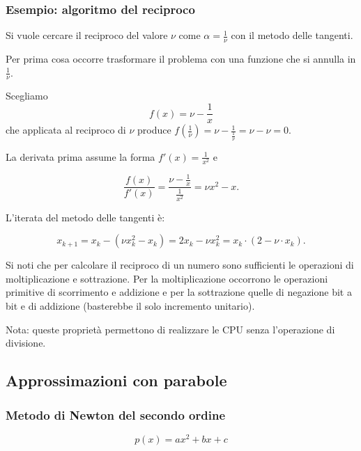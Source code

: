 \documentclass[10pt]{article}
\begin{document}
\subsubsection{Esempio: algoritmo del reciproco}

Si vuole cercare il reciproco del valore $\nu$ come $\alpha = \frac{1}{\nu}$ con il metodo delle tangenti.

Per prima cosa occorre trasformare il problema con una funzione che si annulla in $\frac{1}{\nu}$.

Scegliamo $$f(x) = \nu - \frac{1}{x}$$ che applicata al reciproco di $\nu$ produce
$f(\frac{1}{\nu}) = \nu - \frac{1}{\frac{1}{\nu}} = \nu - \nu = 0$. 

La derivata prima assume la forma $f'(x) = \frac{1}{x^2}$ e

$$\frac{f(x)}{f'(x)} = \frac{\nu - \frac{1}{x}}{\frac{1}{x^2}} = \nu x^2 - x.$$

L'iterata del metodo delle tangenti è:

$$x_{k+1} = x_k - (\nu x_k^2 - x_k) = 2 x_k - \nu x_k^2  = x_k \cdot (2 - \nu \cdot x_k).$$

Si noti che per calcolare il reciproco di un numero sono sufficienti le operazioni di moltiplicazione e sottrazione.
Per la moltiplicazione occorrono le operazioni primitive di scorrimento e addizione e per la sottrazione quelle di negazione bit a bit e di addizione (basterebbe il solo incremento unitario).

Nota: queste proprietà permettono di realizzare le CPU senza l'operazione di divisione.

\subsection{Approssimazioni con parabole}

\subsubsection{Metodo di Newton del secondo ordine}



\begin{equation}
    p (x) = a x^2 + b x + c
\end{equation}
\end{document}
